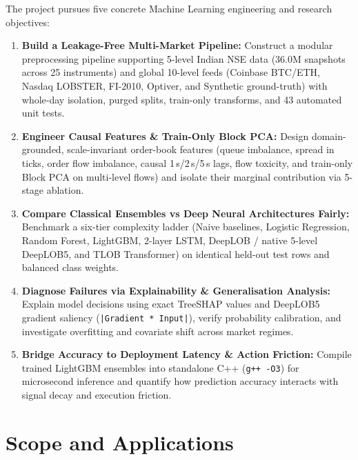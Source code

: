 \documentclass[12pt,a4paper,oneside]{report}
\newcommand{\code}[1]{\texttt{#1}}
\begin{document}
The project pursues five concrete Machine Learning engineering and research objectives:
\begin{enumerate}
  \item \textbf{Build a Leakage-Free Multi-Market Pipeline:} Construct a modular preprocessing pipeline supporting 5-level Indian NSE data (36.0M snapshots across 25 instruments) and global 10-level feeds (Coinbase BTC/ETH, Nasdaq LOBSTER, FI-2010, Optiver, and Synthetic ground-truth) with whole-day isolation, purged splits, train-only transforms, and 43 automated unit tests.
  \item \textbf{Engineer Causal Features \& Train-Only Block PCA:} Design domain-grounded, scale-invariant order-book features (queue imbalance, spread in ticks, order flow imbalance, causal 1\,s/2\,s/5\,s lags, flow toxicity, and train-only Block PCA on multi-level flows) and isolate their marginal contribution via 5-stage ablation.
  \item \textbf{Compare Classical Ensembles vs Deep Neural Architectures Fairly:} Benchmark a six-tier complexity ladder (Naive baselines, Logistic Regression, Random Forest, LightGBM, 2-layer LSTM, DeepLOB / native 5-level DeepLOB5, and TLOB Transformer) on identical held-out test rows and balanced class weights.
  \item \textbf{Diagnose Failures via Explainability \& Generalisation Analysis:} Explain model decisions using exact TreeSHAP values and DeepLOB5 gradient saliency (\code{|Gradient * Input|}), verify probability calibration, and investigate overfitting and covariate shift across market regimes.
  \item \textbf{Bridge Accuracy to Deployment Latency \& Action Friction:} Compile trained LightGBM ensembles into standalone C++ (\code{g++ -O3}) for microsecond inference and quantify how prediction accuracy interacts with signal decay and execution friction.
\end{enumerate}

\section{Scope and Applications}
\end{document}
